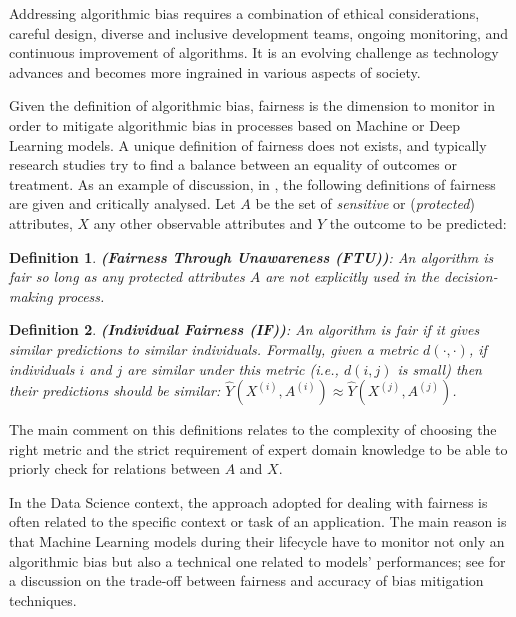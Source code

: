 \documentclass[12pt]{article}
\newtheorem{definition}{Definition}
\begin{document}
Addressing algorithmic bias requires a combination of ethical considerations, careful design, diverse and inclusive development teams, ongoing monitoring, and continuous improvement of algorithms. It is an evolving challenge as technology advances and becomes more ingrained in various aspects of society.

Given the definition of algorithmic bias, fairness is the dimension to monitor in order to mitigate algorithmic bias in processes based on Machine or Deep Learning models. A unique definition of fairness does not exists, and typically research studies try to find a balance between an equality of outcomes or treatment. As an example of discussion, in \cite{defs}, the following definitions of fairness are given and critically analysed. Let $A$ be the set of \textit{sensitive} or (\textit{protected}) attributes, $X$ any other observable attributes and $Y$ the outcome to be predicted:

\begin{definition}
\textbf{(Fairness Through Unawareness (FTU))}: An algorithm is fair so long as any protected attributes $A$ are not explicitly used in the decision-making process.
\end{definition}

\begin{definition}
\textbf{(Individual Fairness (IF))}: An algorithm is fair if it gives similar predictions to similar individuals. Formally, given a metric $d(\cdot, \cdot)$, if individuals $i$ and $j$ are similar under this metric (i.e., $d(i, j)$ is small) then their predictions should be similar: $\hat{Y}(X^{(i)}, A^{(i)}) \approx \hat{Y}(X^{(j)}, A^{(j)})$.
\end{definition}

The main comment on this definitions relates to the complexity of choosing the right metric and the strict requirement of expert domain knowledge to be able to priorly check for relations between $A$ and $X$.


 In the Data Science context, the approach adopted for dealing with fairness is often related to the specific context or task of an application. The main reason is that Machine Learning models during their lifecycle have to monitor not only an algorithmic bias but also a technical one related to models' performances; see \cite{fairea and accuracy} for a discussion on the trade-off between fairness and accuracy of bias mitigation techniques.

\vspace{0.5cm}
\end{document}
